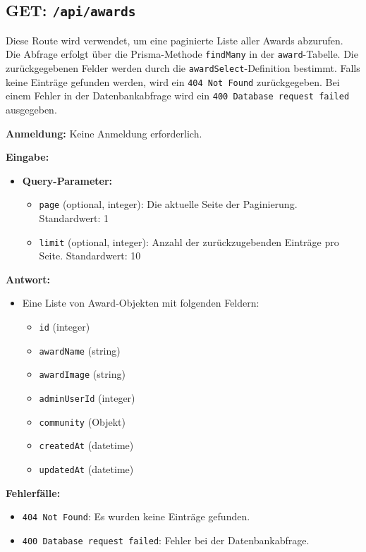 \documentclass[a4paper,12pt]{article}
\begin{document}
\newpage
\subsection{GET: \texttt{/api/awards}}

Diese Route wird verwendet, um eine paginierte Liste aller Awards abzurufen.
Die Abfrage erfolgt über die Prisma-Methode \texttt{findMany} in der
\texttt{award}-Tabelle. Die zurückgegebenen Felder werden durch die
\texttt{awardSelect}-Definition bestimmt. Falls keine Einträge gefunden werden,
wird ein \texttt{404 Not Found} zurückgegeben. Bei einem Fehler in der
Datenbankabfrage wird ein \texttt{400 Database request failed} ausgegeben.

\textbf{Anmeldung:} Keine Anmeldung erforderlich.

\textbf{Eingabe:}
\begin{itemize}
    \item \textbf{Query-Parameter:}
    \begin{itemize}
        \item \texttt{page} (optional, integer):
            Die aktuelle Seite der Paginierung. Standardwert: 1
        \item \texttt{limit} (optional, integer):
            Anzahl der zurückzugebenden Einträge pro Seite. Standardwert: 10
    \end{itemize}
\end{itemize}

\textbf{Antwort:}
\begin{itemize}
    \item Eine Liste von Award-Objekten mit folgenden Feldern:
    \begin{itemize}
        \item \texttt{id} (integer)
        \item \texttt{awardName} (string)
        \item \texttt{awardImage} (string)
        \item \texttt{adminUserId} (integer)
        \item \texttt{community} (Objekt)
        \item \texttt{createdAt} (datetime)
        \item \texttt{updatedAt} (datetime)
    \end{itemize}
\end{itemize}

\textbf{Fehlerfälle:}
\begin{itemize}
    \item \texttt{404 Not Found}:
        Es wurden keine Einträge gefunden.
    \item \texttt{400 Database request failed}:
        Fehler bei der Datenbankabfrage.
\end{itemize}
\end{document}
